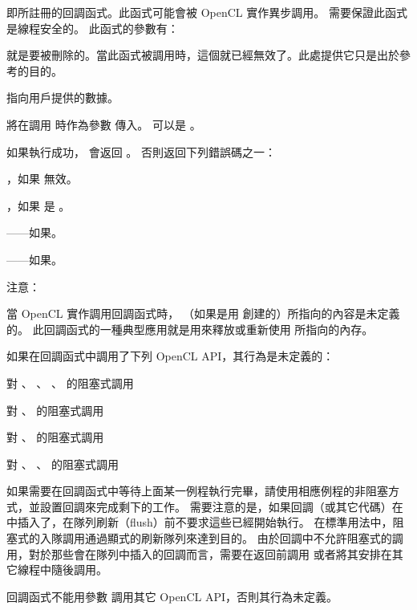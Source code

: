  即所註冊的回調函式。此函式可能會被 OpenCL 實作異步調用。
需要保證此函式是線程安全的。
此函式的參數有：
\startigBase
\item {} 就是要被刪除的。當此函式被調用時，這個就已經無效了。此處提供它只是出於參考的目的。

\item {} 指向用戶提供的數據。
\stopigBase

 將在調用  時作為參數  傳入。
  可以是 。

如果執行成功，  會返回 。
否則返回下列錯誤碼之一：
\startigBase
\item {}，如果  無效。

\item {}，如果  是 。

\item {}——如果\scdevfailres。

\item {}——如果\schostfailres。
\stopigBase

注意：

當 OpenCL 實作調用回調函式時，  （如果是用  創建的）所指向的內容是未定義的。
此回調函式的一種典型應用就是用來釋放或重新使用  所指向的內存。

如果在回調函式中調用了下列 OpenCL API，其行為是未定義的：
\startigBase
\item {}
\item {}
\item 對 、 、 、  的阻塞式調用
\item 對 、  的阻塞式調用
\item 對 、  的阻塞式調用
\item 對 、 、  的阻塞式調用
\stopigBase

如果需要在回調函式中等待上面某一例程執行完畢，請使用相應例程的非阻塞方式，並設置回調來完成剩下的工作。
需要注意的是，如果回調（或其它代碼）在中插入了，在隊列刷新（flush）前不要求這些已經開始執行。
在標準用法中，阻塞式的入隊調用通過顯式的刷新隊列來達到目的。
由於回調中不允許阻塞式的調用，對於那些會在隊列中插入的回調而言，需要在返回前調用  或者將其安排在其它線程中隨後調用。

回調函式不能用參數  調用其它 OpenCL API，否則其行為未定義。

